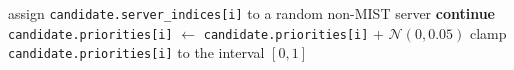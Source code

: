 \begin{algorithm}[H]
\caption{Operator \texttt{randomizeCandidate}(candidate, perturbationRate)}
\begin{algorithmic}[1]
			\State assign \texttt{candidate.server\_indices[i]} to a random non-MIST server
			\State \textbf{continue}
		\EndIf
	\EndIf
		\State \texttt{candidate.priorities[i]} $\gets$ \texttt{candidate.priorities[i]} + $\mathcal{N}(0, 0.05)$
		\State clamp \texttt{candidate.priorities[i]} to the interval $[0,1]$
	\EndIf
\EndFor
\end{algorithmic}
\end{algorithm}